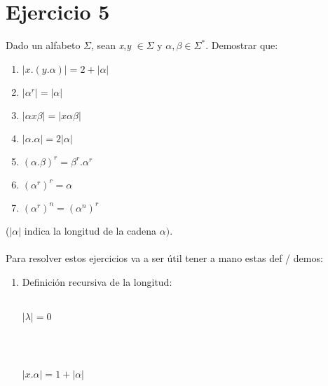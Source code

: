 \documentclass{article}
\begin{document}
{{\section*{Ejercicio 5}{Dado un alfabeto $\Sigma$, sean \textit{x},\textit{y} $\in \Sigma$ y $\alpha,\beta \in \Sigma^*$. Demostrar que:}
\begin{enumerate}[label=\alph*.,font=\itshape]
    \item $|x.(y.\alpha)| = 2 + |\alpha|$
    \item $|\alpha^r|=|\alpha|$
    \item $|\alpha x \beta| = |x \alpha \beta|$
    \item $|\alpha . \alpha| = 2 |\alpha|$
    \item $(\alpha . \beta)^r = \beta^r . \alpha^r$
    \item $(\alpha^r)^r = \alpha$
    \item $(\alpha^r)^n = (\alpha^n)^r$
\end{enumerate}

{($|\alpha|$ indica la longitud de la cadena $\alpha)$.}
\\
\\
{Para resolver estos ejercicios va a ser útil tener a mano estas def / demos:}

\renewcommand\labelenumi{(\theenumi)}
\begin{enumerate}
    \item {Definición recursiva de la longitud:}
    \\
    \\
    \centerline{{$|\lambda| = 0$}}
    \\
    \\
    \centerline{{$|x.\alpha| = 1 + |\alpha|$}}


\end{enumerate}}}
\end{document}
